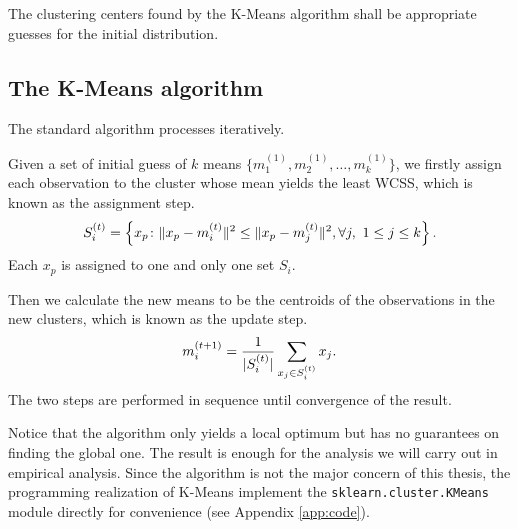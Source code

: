 The clustering centers found by the K-Means algorithm shall be
appropriate guesses for the initial distribution.


\subsection{The K-Means algorithm}
\label{sec:preliminary:kmeans:algo}
The standard algorithm processes iteratively.

Given a set of initial guess of $k$ means $\{m_1^{(1)},m_2^{(1)},\dots,m_k^{(1)}\}$,
we firstly assign each observation to the cluster whose mean yields the least WCSS,
which is known as the assignment step.
		\begin{equation}
		\label{eq:preliminary:kmeans:assign}
		S_i^{(t)} = \left\{x_p \colon \lVert x_p-m_i^{(t)}\rVert^2 \leq \lVert x_p-m_j^{(t)}\rVert^2,
			\forall j,\ 1\leq j \leq k  \right\}.
		\end{equation}
Each $x_p$ is assigned to one and only one set $S_i$.

Then we calculate the new means to be the centroids of the observations in the new clusters,
which is known as the update step.
		\begin{equation}
		\label{eq:preliminary:kmeans:update}
		m_i^{(t+1)} = \frac{1}{\lvert S_i^{(t)}\rvert} \sum_{x_j \in S_i^{(t)}} x_j.
		\end{equation}
The two steps are performed in sequence until convergence of the result.

Notice that the algorithm only yields a local optimum 
but has no guarantees on finding the global one.
The result is enough for the analysis we will carry out in empirical analysis.
Since the algorithm is not the major concern of this thesis,
the programming realization of K-Means implement 
the \texttt{sklearn.cluster.KMeans} module directly for convenience
(see Appendix \ref{app:code}).


